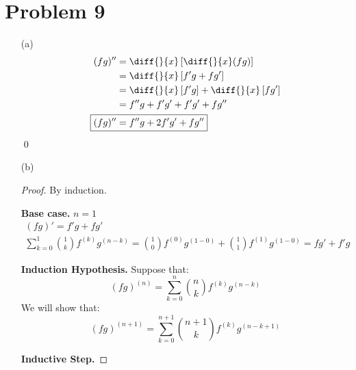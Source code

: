 \documentclass{article}
\begin{document}
\section*{Problem 9}
\begin{itemize}
\item[(a)]
\begin{align*}
	(fg)''&=\diff{}{x}\left[\diff{}{x}(fg)\right] \\
	&=\diff{}{x}\left[f'g+fg'\right] \\
	&=\diff{}{x}\left[f'g\right]+\diff{}{x}\left[fg'\right] \\
	&=f''g+f'g'+f'g'+fg'' \\
	\Aboxed{(fg)''&=f''g+2f'g'+fg''}
\end{align*}
\qed

\item[(b)]
\begin{proof}
	By induction.

	\textbf{Base case.} $n=1$
	\begin{gather*}
		(fg)'=f'g+fg' \\
		\sum_{k=0}^{1}\binom{1}{k}f^{(k)}g^{(n-k)}=\binom{1}{0}f^{(0)}g^{(1-0)}+\binom{1}{1}f^{(1)}g^{(1-0)}=fg'+f'g
	\end{gather*}

	\textbf{Induction Hypothesis.} Suppose that:
	\setlength{\abovedisplayskip}{0pt}
	\begin{equation*}
		(fg)^{(n)}=\sum_{k=0}^{n}\binom{n}{k}f^{(k)}g^{(n-k)}
	\end{equation*}
	We will show that:
	\begin{equation*}
		(fg)^{(n+1)}=\sum_{k=0}^{n+1}\binom{n+1}{k}f^{(k)}g^{(n-k+1)}
	\end{equation*}

\textbf{Inductive Step.}


\end{proof}
\end{itemize}
\end{document}
